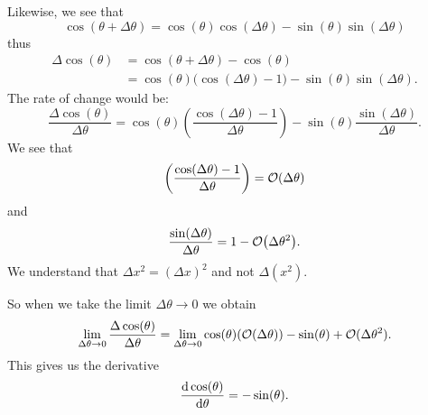 Likewise, we see that
\begin{equation}
\cos(\theta+\Delta\theta)=\cos(\theta)\cos(\Delta\theta)-\sin(\theta)\sin(\Delta\theta)
\end{equation}
thus
\begin{equation}
\begin{split}
\Delta\cos(\theta)
&=\cos(\theta+\Delta\theta)-\cos(\theta)\\
&=\cos(\theta)\bigl(\cos(\Delta\theta)-1\bigr)-\sin(\theta)\sin(\Delta\theta).
\end{split}
\end{equation}
The rate of change would be:
\begin{equation}
\frac{\Delta\cos(\theta)}{\Delta\theta}
=\cos(\theta)\left(\frac{\cos(\Delta\theta)-1}{\Delta\theta}\right)-\sin(\theta)\frac{\sin(\Delta\theta)}{\Delta\theta}.
\end{equation}
We see that
\begin{equation}
\left(\frac{\cos(\Delta\theta)-1}{\Delta\theta}\right)=\mathcal{O}(\Delta\theta)
\end{equation}
and
\begin{equation}
\frac{\sin(\Delta\theta)}{\Delta\theta}=1-\mathcal{O}\bigl(\Delta\theta^{2}\bigr).
\end{equation}
We understand that $\Delta x^{2}=(\Delta x)^{2}$ and not $\Delta(x^{2})$.

So when we take the limit $\Delta\theta\to0$ we obtain
\begin{equation}
\lim_{\Delta\theta\to0}\frac{\Delta\cos(\theta)}{\Delta\theta}
=
\lim_{\Delta\theta\to0}\cos(\theta)(\mathcal{O}(\Delta\theta))-\sin(\theta)+\mathcal{O}(\Delta\theta^{2}).
\end{equation}
This gives us the derivative
\begin{equation}
\frac{\mathrm{d}\cos(\theta)}{\mathrm{d}\theta}=-\sin(\theta).
\end{equation}

